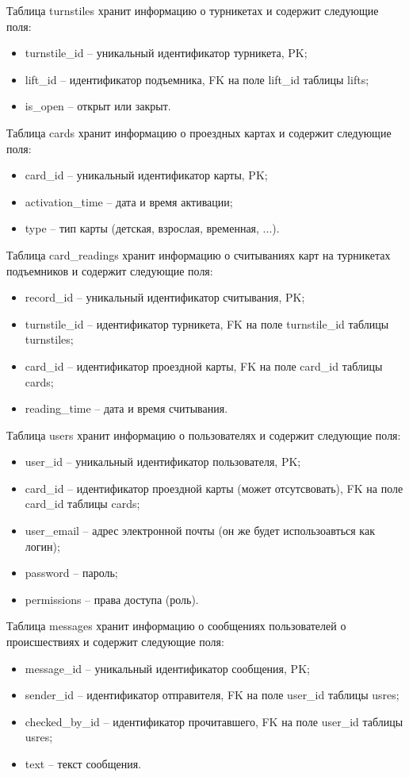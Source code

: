 Таблица turnstiles хранит информацию о турникетах и содержит следующие поля:
\begin{itemize}
	\item turnstile\_id -- уникальный идентификатор турникета, PK;
	\item lift\_id -- идентификатор подъемника, FK на поле lift\_id таблицы lifts;
	\item is\_open -- открыт или закрыт.
\end{itemize}


Таблица cards хранит информацию о проездных картах и содержит следующие поля:
\begin{itemize}
	\item card\_id -- уникальный идентификатор карты, PK;
	\item activation\_time -- дата и время активации;
	\item type -- тип карты (детская, взрослая, временная, ...).
\end{itemize}


Таблица card\_readings хранит информацию о считываниях карт на турникетах подъемников и содержит следующие поля:
\begin{itemize}
	\item record\_id -- уникальный идентификатор считывания, PK;
	\item turnstile\_id -- идентификатор турникета, FK на поле turnstile\_id таблицы turnstiles;
	\item card\_id -- идентификатор проездной карты, FK на поле card\_id таблицы cards;
	\item reading\_time -- дата и время считывания.
\end{itemize}


Таблица users хранит информацию о пользователях и содержит следующие поля:
\begin{itemize}
	\item user\_id -- уникальный идентификатор пользователя, PK;
	\item card\_id -- идентификатор проездной карты (может отсутсвовать), FK на поле card\_id таблицы cards;
	\item user\_email -- адрес электронной почты (он же будет использоавться как логин);
	\item password -- пароль;
	\item permissions -- права доступа (роль).
\end{itemize}


Таблица messages хранит информацию о сообщениях пользователей о происшествиях и содержит следующие поля:
\begin{itemize}
	\item message\_id -- уникальный идентификатор сообщения, PK;
	\item sender\_id -- идентификатор отправителя, FK на поле user\_id таблицы usres;
	\item checked\_by\_id -- идентификатор прочитавшего, FK на поле user\_id таблицы usres;
	\item text -- текст сообщения.	
\end{itemize}



